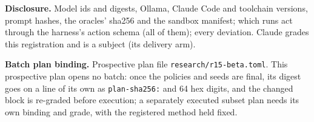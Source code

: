 \documentclass[11pt]{article}
\begin{document}
\begin{answer}
\textbf{Disclosure.} Model ids and digests, Ollama, Claude Code and toolchain
versions, prompt hashes, the oracles' sha256 and the sandbox manifest; which
runs act through the harness's action schema (all of them); every deviation.
Claude grades this registration and is a subject (its delivery arm).

\textbf{Batch plan binding.} Prospective plan file
\texttt{research/r15-beta.toml}. This prospective plan opens no batch: once the
policies and seeds are final, its digest goes on a line of its own as
\texttt{plan-sha256:} and 64 hex digits, and the changed block is re-graded
before execution; a separately executed subset plan needs its own binding and
grade, with the registered method held fixed.
\end{answer}
\end{document}
